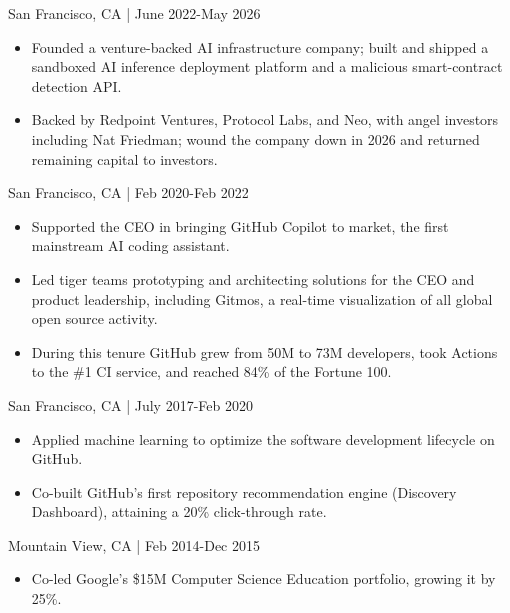 \documentclass[11pt,article,oneside]{memoir}
\begin{document}
 \hfill San Francisco, CA | June 2022-May 2026
\begin{itemize}[nolistsep]
\item[-] Founded a venture-backed AI infrastructure company; built and shipped a sandboxed AI inference deployment platform and a malicious smart-contract detection API.
\item[-] Backed by Redpoint Ventures, Protocol Labs, and Neo, with angel investors including Nat Friedman; wound the company down in 2026 and returned remaining capital to investors.
\end{itemize}

 \hfill San Francisco, CA | Feb 2020-Feb 2022
\begin{itemize}[nolistsep]
\item[-]Supported the CEO in bringing GitHub Copilot to market, the first mainstream AI coding assistant.
\item[-]Led tiger teams prototyping and architecting solutions for the CEO and product leadership, including Gitmos, a real-time visualization of all global open source activity.
\item[-]During this tenure GitHub grew from 50M to 73M developers, took Actions to the \#1 CI service, and reached 84\% of the Fortune 100.
\end{itemize}

 \hfill San Francisco, CA | July 2017-Feb 2020
\begin{itemize}[nolistsep]
\item[-]Applied machine learning to optimize the software development lifecycle on GitHub.
\item[-]Co-built GitHub's first repository recommendation engine (Discovery Dashboard), attaining a 20\% click-through rate.
\end{itemize}

 \hfill Mountain View, CA | Feb 2014-Dec 2015
\begin{itemize}[nolistsep]
\item[-]Co-led Google's \$15M Computer Science Education portfolio, growing it by 25\%.
\end{itemize}

\bigskip

\medskip
\end{document}
